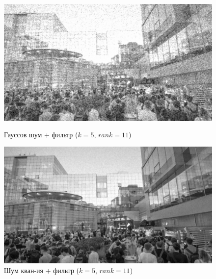 \documentclass[a4paper]{article}
\begin{document}
\begin{figure}[H]
    \begin{minipage}{0.49\textwidth}
        \centering \includegraphics[width=\textwidth]{images/3_nonlinear_filters/gaussian - rang (k=5, rank=11).jpg}
        \caption{Гауссов шум + фильтр ($k = 5$, $rank = 11$)}
    \end{minipage}\hfill
    \begin{minipage}{0.49\textwidth}
        \centering \includegraphics[width=\textwidth]{images/3_nonlinear_filters/poisson - rang (k=5, rank=11).jpg}
        \caption{Шум кван-ия + фильтр ($k = 5$, $rank = 11$)}
    \end{minipage}
\end{figure}
\end{document}
